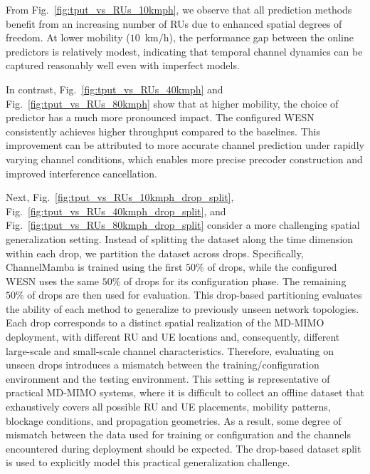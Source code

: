 \documentclass[lettersize,journal]{IEEEtran}
\begin{document}
From Fig.~\ref{fig:tput_vs_RUs_10kmph}, we observe that all prediction methods benefit from an increasing number of RUs due to enhanced spatial degrees of freedom. At lower mobility ($10$~km/h), the performance gap between the online predictors is relatively modest, indicating that temporal channel dynamics can be captured reasonably well even with imperfect models.

In contrast, Fig.~\ref{fig:tput_vs_RUs_40kmph} and Fig.~\ref{fig:tput_vs_RUs_80kmph} show that at higher mobility, the choice of predictor has a much more pronounced impact. 
The configured WESN consistently achieves higher throughput compared to the baselines. 
This improvement can be attributed to more accurate channel prediction under rapidly varying channel conditions, which enables more precise precoder construction and improved interference cancellation.

Next, Fig.~\ref{fig:tput_vs_RUs_10kmph_drop_split}, Fig.~\ref{fig:tput_vs_RUs_40kmph_drop_split}, and Fig.~\ref{fig:tput_vs_RUs_80kmph_drop_split} consider a more challenging spatial generalization setting.
Instead of splitting the dataset along the time dimension within each drop, we partition the dataset across drops. 
Specifically, ChannelMamba is trained using the first $50\%$ of drops, while the configured WESN uses the same $50\%$ of drops for its configuration phase. 
The remaining $50\%$ of drops are then used for evaluation.
This drop-based partitioning evaluates the ability of each method to generalize to previously unseen network topologies. 
Each drop corresponds to a distinct spatial realization of the MD-MIMO deployment, with different RU and UE locations and, consequently, different large-scale and small-scale channel characteristics. 
Therefore, evaluating on unseen drops introduces a mismatch between the training/configuration environment and the testing environment. 
This setting is representative of practical MD-MIMO systems, where it is difficult to collect an offline dataset that exhaustively covers all possible RU and UE placements, mobility patterns, blockage conditions, and propagation geometries.
As a result, some degree of mismatch between the data used for training or configuration and the channels encountered during deployment should be expected. 
The drop-based dataset split is used to explicitly model this practical generalization challenge.
\end{document}
